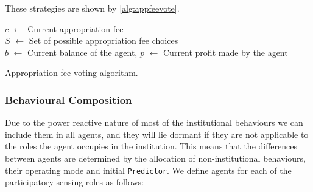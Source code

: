 These strategies are shown by \autoref{alg:appfeevote}.

\begin{algorithm}

	$c$ $\leftarrow$ Current appropriation fee \\
	$S$ $\leftarrow$ Set of possible appropriation fee choices \\
	$b$ $\leftarrow$ Current balance of the agent,
	$p$ $\leftarrow$ Current profit made by the agent \\
	\BlankLine
	\caption{Appropriation fee voting algorithm.}\label{alg:appfeevote}
\end{algorithm}


\subsubsection*{Behavioural Composition}

Due to the power reactive nature of most of the institutional behaviours we can include them in all agents, and they will lie dormant if they are not applicable to the roles the agent occupies in the institution. This means that the differences between agents are determined by the allocation of non-institutional behaviours, their operating mode and initial \texttt{Predictor}. We define agents for each of the participatory sensing roles as follows:

